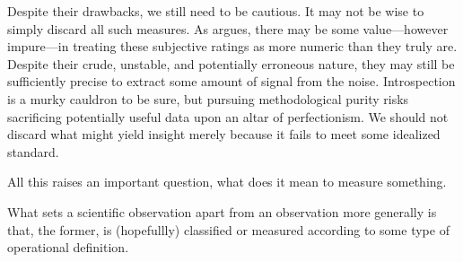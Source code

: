 Despite their drawbacks, we still need to be cautious. It may not be wise to simply discard all such measures. As \textcite{Labovitz1967} argues, there may be some value—however impure—in treating these subjective ratings as more numeric than they truly are. Despite their crude, unstable, and potentially erroneous nature, they may still be sufficiently precise to extract some amount of signal from the noise. Introspection is a murky cauldron to be sure, but pursuing methodological purity risks sacrificing potentially useful data upon an altar of perfectionism. We should not discard what might yield insight merely because it fails to meet some idealized standard.

All this raises an important question, what does it mean to measure something.



What sets a scientific observation apart from an observation more generally is that, the former, is (hopefullly) classified or measured according to some type of operational definition.  











